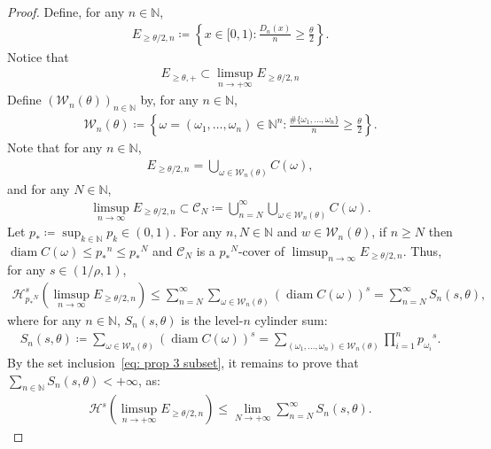 \documentclass[10pt,a4paper]{amsart}
\begin{document}
\begin{proof}
Define, for any $n\in\mathbb{N}$,
\begin{align*}
    E_{\geq\theta/2,n} \coloneqq \left\{x\in[0,1): \frac{D_n(x)}{n}\geq\frac{\theta}{2}\right\}.
\end{align*}
Notice that
\begin{align}
    \label{eq: prop 3 subset}
    E_{\geq\theta,+}\subset\limsup_{n\to+\infty}E_{\geq\theta/2,n}
\end{align}
Define $(\mathcal{W}_n(\theta))_{n\in\mathbb{N}}$ by, for any $n\in\mathbb{N}$,
\begin{align*}
    \mathcal{W}_n(\theta)
    \coloneqq\left\{\omega=(\omega_1,\ldots,\omega_n)\in\mathbb{N}^n:\frac{\#\{\omega_1,\ldots,\omega_n\}}{n}\geq\frac{\theta}{2}\right\}.
\end{align*}
Note that for any $n\in\mathbb{N}$,
\begin{align*}
    E_{\geq \theta/2,n}
    =\bigcup_{\omega\in\mathcal{W}_n(\theta)} C(\omega),
\end{align*}
and for any $N\in\mathbb{N}$,
\begin{align*}
    \limsup_{n\to\infty}E_{\geq \theta/2,n}
    \subset
    \mathcal{C}_N\coloneqq\bigcup_{n=N}^\infty \bigcup_{\omega\in\mathcal{W}_n(\theta)} C(\omega).
\end{align*}
Let $p_*\coloneqq\sup_{k\in\mathbb{N}}p_k\in(0,1)$. For any $n,N\in\mathbb{N}$ and $w\in\mathcal{W}_n(\theta)$, if $n\geq{N}$ then $\operatorname{diam}C(\omega)\leq {p_*}^n\leq {p_*}^N$ and $\mathcal{C}_N$ is a ${p_*}^N$-cover of $\limsup_{n\to\infty}E_{\geq \theta/2,n}$.
Thus, for any $s\in(1/\rho,1)$,
\begin{align*}
    \mathcal{H}^s_{{p_*}^N}{\left(\limsup_{n\to\infty}E_{\geq \theta/2,n}\right)}
    \leq
    \sum_{n=N}^\infty\sum_{\omega\in\mathcal W_n(\theta)}(\operatorname{diam}{C(\omega)})^s
    =
    \sum_{n=N}^\infty S_n(s,\theta),
\end{align*}
where for any $n\in\mathbb{N}$, $S_n(s,\theta)$ is the level-$n$ cylinder sum: 
\begin{align*}
    S_n(s,\theta)
    \coloneqq \sum_{\omega\in\mathcal{W}_n(\theta)} (\operatorname{diam}{C(\omega)})^s
    =\sum_{(\omega_1,\ldots,\omega_n)\in\mathcal{W}_n(\theta)}
    \prod_{i=1}^n {p_{\omega_i}}^{s}.
\end{align*}
By the set inclusion~\eqref{eq: prop 3 subset}, it remains to prove that $\sum_{n\in\mathbb{N}} S_n(s,\theta)<+\infty$, as:
\begin{align}
    \label{eq:HsEn}
    \mathcal{H}^s\left(\limsup_{n\to+\infty}E_{\geq\theta/2,n}\right)
    \leq \lim_{N\to+\infty}\sum_{n=N}^{\infty}S_n(s,\theta).
\end{align}


\end{proof}
\end{document}
